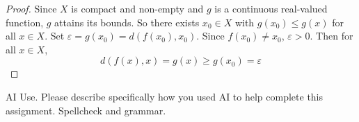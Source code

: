 \documentclass[minion]{homework}
\begin{document}
\begin{problems}
\begin{proof}
  Since $X$ is compact and non-empty and $g$ is a continuous real-valued function, $g$ attains its bounds. So there exists $x_0 \in X$ with $g(x_0) \leq g(x)$ for all $x \in X$.
  Set $\varepsilon = g(x_0) = d(f(x_0), x_0)$. Since $f(x_0) \neq x_0$, $\varepsilon > 0$. Then for all $x \in X$,
  $$d(f(x), x) = g(x) \geq g(x_0) = \varepsilon$$
\end{proof}
\problem AI Use. Please describe specifically how you used AI to help complete this assignment.
\newline \newline
Spellcheck and grammar.
\end{problems}
\end{document}
